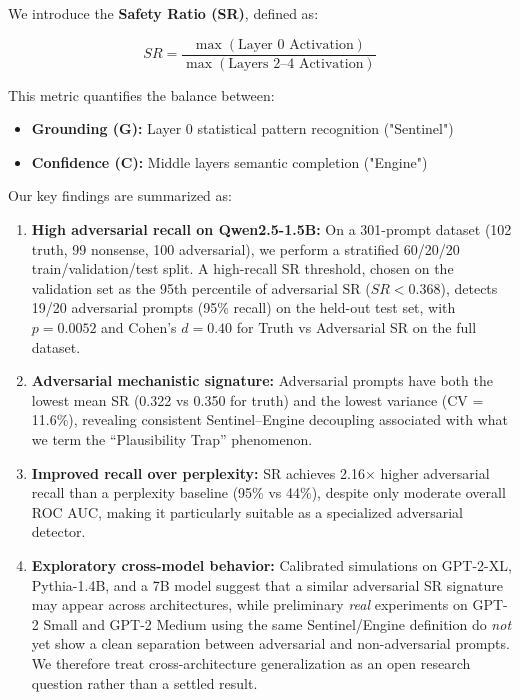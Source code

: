 We introduce the \textbf{Safety Ratio (SR)}, defined as:

\begin{equation}
SR = \frac{\max(\text{Layer 0 Activation})}{\max(\text{Layers 2--4 Activation})}
\end{equation}

This metric quantifies the balance between:
\begin{itemize}
    \item \textbf{Grounding (G):} Layer 0 statistical pattern recognition ("Sentinel")
    \item \textbf{Confidence (C):} Middle layers semantic completion ("Engine")
\end{itemize}

Our key findings are summarized as:
\begin{enumerate}
    \item \textbf{High adversarial recall on Qwen2.5-1.5B:} On a 301-prompt dataset (102 truth, 99 nonsense, 100 adversarial), we perform a stratified 60/20/20 train/validation/test split. A high-recall SR threshold, chosen on the validation set as the 95th percentile of adversarial SR ($SR < 0.368$), detects 19/20 adversarial prompts (95\% recall) on the held-out test set, with $p = 0.0052$ and Cohen's $d = 0.40$ for Truth vs Adversarial SR on the full dataset.
    \item \textbf{Adversarial mechanistic signature:} Adversarial prompts have both the lowest mean SR (0.322 vs 0.350 for truth) and the lowest variance (CV = 11.6\%), revealing consistent Sentinel--Engine decoupling associated with what we term the ``Plausibility Trap'' phenomenon.
    \item \textbf{Improved recall over perplexity:} SR achieves 2.16$\times$ higher adversarial recall than a perplexity baseline (95\% vs 44\%), despite only moderate overall ROC AUC, making it particularly suitable as a specialized adversarial detector.
    \item \textbf{Exploratory cross-model behavior:} Calibrated simulations on GPT-2-XL, Pythia-1.4B, and a 7B model suggest that a similar adversarial SR signature may appear across architectures, while preliminary \emph{real} experiments on GPT-2 Small and GPT-2 Medium using the same Sentinel/Engine definition do \emph{not} yet show a clean separation between adversarial and non-adversarial prompts. We therefore treat cross-architecture generalization as an open research question rather than a settled result.
\end{enumerate}

